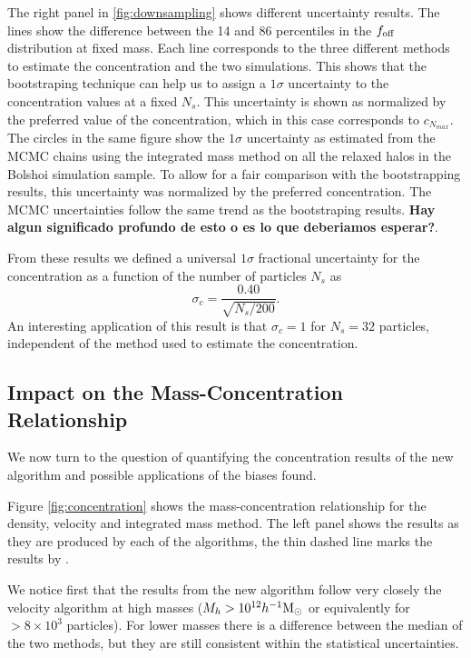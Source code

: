 \documentclass{emulateapj}
\newcommand{\hMsun}{{\ifmmode{h^{-1}{\rm {M_{\odot}}}}\else{$h^{-1}{\rm{M_{\odot}}}$}\fi}}
\begin{document}
The right panel in \ref{fig:downsampling} shows different uncertainty
results. 
The lines show the difference between the 14 and 86 percentiles in the
$f_{\rm off}$ distribution at fixed mass.
Each line corresponds to the three different methods to estimate the
concentration and the two simulations.
This shows that the bootstraping technique can help us to assign a
$1\sigma$ uncertainty to the concentration values at a fixed $N_s$. 
This uncertainty is shown as normalized by the preferred value of the
concentration, which in this case corresponds to $c_{N_{max}}$.  
The circles in the same figure show the $1\sigma$ uncertainty as
estimated from the MCMC chains using the integrated mass method on all
the relaxed halos in the Bolshoi simulation sample. 
To allow for a fair comparison with the bootstrapping results, this
uncertainty was normalized by the preferred concentration.
The MCMC uncertainties follow the same trend as the bootstraping
results. {\bf Hay algun significado profundo de esto o es lo que
  deberiamos esperar?}.

From these results we defined a universal $1\sigma$ fractional
uncertainty for the concentration as a function of the number of
particles $N_s$ as  
%
\begin{equation}
\sigma_{c} = \frac{0.40}{\sqrt{N_s/200}}.
\end{equation}
%
An interesting application of this result is that $\sigma_c=1$ for
$N_s=32$ particles, independent of the method used to estimate the
concentration.  

 
\subsection{Impact on the Mass-Concentration Relationship}

We now turn to the question of quantifying the concentration results
of the new algorithm and possible applications of the biases found. 

Figure \ref{fig:concentration} shows the mass-concentration
relationship for the density, velocity and integrated mass method.
The left panel shows the results as they are produced by each of the
algorithms, the thin dashed line marks the results by
\citep{Prada2012}.

We notice first that the results from the new algorithm follow very
closely the velocity algorithm at high masses ($M_h>10^{12}\hMsun$ or
equivalently for $>8\times10^3$ particles). 
For lower masses there is a difference between the median of the two
methods, but they are still consistent within the statistical
uncertainties.
\end{document}

